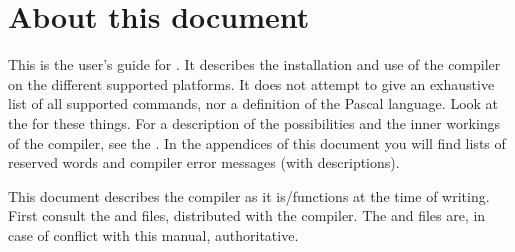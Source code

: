 \section{About this document}
This is the user's guide for \fpc . It describes the installation and
use of the \fpc compiler on the different supported platforms.
It does not attempt to give an exhaustive list of all supported commands,
nor a definition of the Pascal language. Look at the
 for these things. For a description of the possibilities and the
inner workings of the compiler, see the
\progref . In the appendices of this document you will find lists of
reserved words and compiler error messages (with descriptions).

This document describes the compiler as it is/functions at the time of
writing. First consult the  and  files, distributed
with the compiler. The  and  files are, in case of
conflict with this manual, authoritative.

